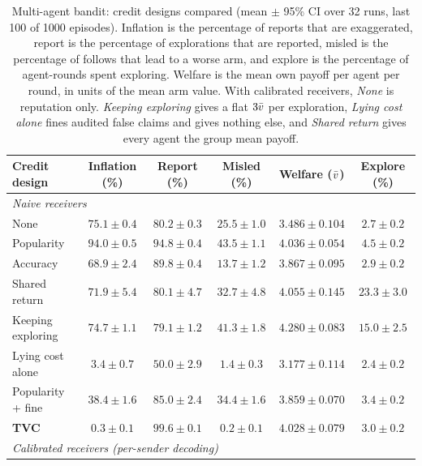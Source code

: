 \begin{table}[t]
  \caption{Multi-agent bandit: credit designs compared (mean $\pm$ 95\% CI over 32 runs, last 100 of 1000 episodes). Inflation is the percentage of reports that are exaggerated, report is the percentage of explorations that are reported, misled is the percentage of follows that lead to a worse arm, and explore is the percentage of agent-rounds spent exploring. Welfare is the mean own payoff per agent per round, in units of the mean arm value. With calibrated receivers, \emph{None} is reputation only. \emph{Keeping exploring} gives a flat $3\bar v$ per exploration, \emph{Lying cost alone} fines audited false claims and gives nothing else, and \emph{Shared return} gives every agent the group mean payoff.}
  \label{tab:bandit}
  \centering
  \small
  \setlength{\tabcolsep}{4pt}
  \begin{tabular}{lccccc}
    \toprule
    Credit design & Inflation (\%)  & Report (\%)  & Misled (\%)  & Welfare ($\bar v$)  & Explore (\%) \\
    \midrule
    \multicolumn{6}{l}{\emph{Naive receivers}} \\
    None & $75.1 \pm 0.4$ & $80.2 \pm 0.3$ & $25.5 \pm 1.0$ & $3.486 \pm 0.104$ & $2.7 \pm 0.2$ \\
    Popularity & $94.0 \pm 0.5$ & $94.8 \pm 0.4$ & $43.5 \pm 1.1$ & $4.036 \pm 0.054$ & $4.5 \pm 0.2$ \\
    Accuracy & $68.9 \pm 2.4$ & $89.8 \pm 0.4$ & $13.7 \pm 1.2$ & $3.867 \pm 0.095$ & $2.9 \pm 0.2$ \\
    Shared return & $71.9 \pm 5.4$ & $80.1 \pm 4.7$ & $32.7 \pm 4.8$ & $4.055 \pm 0.145$ & $\mathbf{23.3 \pm 3.0}$ \\
    Keeping exploring & $74.7 \pm 1.1$ & $79.1 \pm 1.2$ & $41.3 \pm 1.8$ & $\mathbf{4.280 \pm 0.083}$ & $15.0 \pm 2.5$ \\
    Lying cost alone & $3.4 \pm 0.7$ & $50.0 \pm 2.9$ & $1.4 \pm 0.3$ & $3.177 \pm 0.114$ & $2.4 \pm 0.2$ \\
    Popularity + fine & $38.4 \pm 1.6$ & $85.0 \pm 2.4$ & $34.4 \pm 1.6$ & $3.859 \pm 0.070$ & $3.4 \pm 0.2$ \\
    \textbf{TVC} & $\mathbf{0.3 \pm 0.1}$ & $\mathbf{99.6 \pm 0.1}$ & $\mathbf{0.2 \pm 0.1}$ & $4.028 \pm 0.079$ & $3.0 \pm 0.2$ \\
    \midrule
    \multicolumn{6}{l}{\emph{Calibrated receivers (per-sender decoding)}} \\

\end{tabular}
\end{table}
